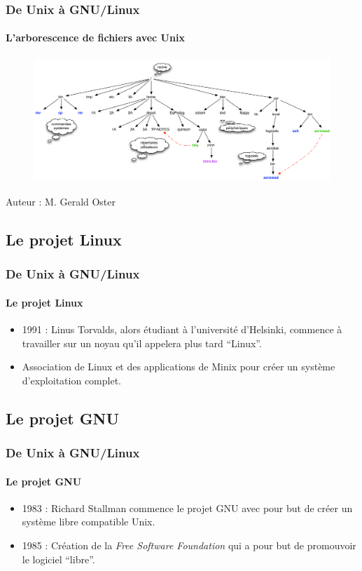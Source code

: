 \documentclass{beamer}
\begin{document}
            \begin{frame}
                \frametitle{De Unix à GNU/Linux}
                \framesubtitle{L'arborescence de fichiers avec Unix}
                \begin{figure}[h]
                  \centering
                  \includegraphics[scale=0.208]{figures/filesystem_unix.png}
                \end{figure}
                \tiny{Auteur : M. Gerald Oster}
            \end{frame}
            
        \subsection[Le projet Linux]{Le projet Linux}
        
            \begin{frame}
                \frametitle{De Unix à GNU/Linux}
                \framesubtitle{Le projet Linux}
                \begin{itemize}
                    \item 1991 : Linus Torvalds, alors étudiant à l'université d'Helsinki, commence à travailler sur un noyau qu'il appelera plus tard \foreignquote{french}{Linux}.
                    \item Association de Linux et des applications de Minix pour créer un système d'exploitation complet.
                \end{itemize}
            \end{frame}
            
        \subsection[Le projet GNU]{Le projet GNU}
        
            \begin{frame}
                \frametitle{De Unix à GNU/Linux}
                \framesubtitle{Le projet GNU}
                \begin{itemize}
                    \item 1983 : Richard Stallman commence le projet GNU avec pour but de créer un système libre compatible Unix.
                    \item 1985 : Création de la \textit{Free Software Foundation} qui a pour but de promouvoir le logiciel \foreignquote{french}{libre}.
                \end{itemize}
            \end{frame}
            
\end{document}
